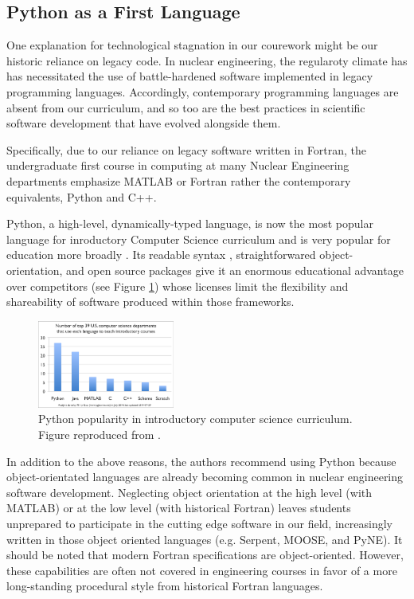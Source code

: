 \documentclass{anstrans}
\begin{document}
\subsection{Python as a First Language}

One explanation for technological stagnation in our courework might be our
historic reliance on legacy code. In nuclear engineering, the regularoty climate
has has necessitated the use of battle-hardened software implemented in legacy
programming languages. Accordingly, contemporary programming languages are
absent from our curriculum, and so too are the best practices in scientific
software development \cite{wilson_best_2014} that have evolved alongside them.

Specifically, due to our reliance on legacy software written in Fortran, the
undergraduate first course in computing at many Nuclear Engineering departments
emphasize MATLAB or Fortran rather the contemporary equivalents, Python and C++.

Python, a high-level, dynamically-typed language, is now the most popular
language for inroductory Computer Science curriculum \cite{guo_python_2014} and
is very popular for education more broadly
\cite{myers_python_2007,stajano_python_2000,backer_computational_2007}. Its
readable syntax \cite{stefik_empirical_2013}, straightforwared
object-orientation, and open source packages give it an enormous educational
advantage over competitors (see Figure \ref{fig:guo}) whose licenses limit the
flexibility and shareability of software produced within those frameworks.

\begin{figure}[htbp!]
\begin{center}
\includegraphics[width=0.4\textwidth]{guo.eps}
\end{center}
\caption{Python popularity in introductory computer science curriculum. Figure
reproduced from \cite{guo_python_2014}. }
\label{fig:guo}
\end{figure}


In addition to the above reasons, the authors recommend using Python
because object-orientated languages are already becoming common in nuclear
engineering software development.  Neglecting object orientation at the high
level (with MATLAB) or at the low level (with historical Fortran) leaves students
unprepared to participate in the cutting edge software in our field,
increasingly written in those object oriented languages (e.g.
Serpent\cite{leppanen_serpentcontinuous-energy_2013}, 
MOOSE\cite{gaston_moose:_2009}, and
PyNE\cite{scopatz_pyne:_2012}). It should be noted that modern Fortran specifications 
are object-oriented.  However, these capabilities are often not covered in 
engineering courses in favor of a more long-standing procedural style from historical
Fortran languages.
\end{document}
